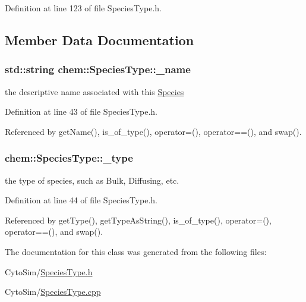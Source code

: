 Definition at line 123 of file Species\-Type.\-h.



\subsection{Member Data Documentation}
\hypertarget{classchem_1_1SpeciesType_ab7c1653d2c84cfafe2fac832778d74af}{
\subsubsection[{\-\_\-name}]{\setlength{\rightskip}{0pt plus 5cm}std\-::string {\bf chem\-::\-Species\-Type\-::\-\_\-name}}}\label{classchem_1_1SpeciesType_ab7c1653d2c84cfafe2fac832778d74af}


the descriptive name associated with this \hyperlink{classchem_1_1Species}{Species} 



Definition at line 43 of file Species\-Type.\-h.



Referenced by get\-Name(), is\-\_\-of\-\_\-type(), operator=(), operator==(), and swap().

\hypertarget{classchem_1_1SpeciesType_ac42a8f904e71a32858821e3c469c09a9}{
\subsubsection[{\-\_\-type}]{ {\bf chem\-::\-Species\-Type\-::\-\_\-type}}}\label{classchem_1_1SpeciesType_ac42a8f904e71a32858821e3c469c09a9}


the type of species, such as Bulk, Diffusing, etc. 



Definition at line 44 of file Species\-Type.\-h.



Referenced by get\-Type(), get\-Type\-As\-String(), is\-\_\-of\-\_\-type(), operator=(), operator==(), and swap().



The documentation for this class was generated from the following files\-:\begin{DoxyCompactItemize}
\item 
Cyto\-Sim/\hyperlink{SpeciesType_8h}{Species\-Type.\-h}\item 
Cyto\-Sim/\hyperlink{SpeciesType_8cpp}{Species\-Type.\-cpp}\end{DoxyCompactItemize}
